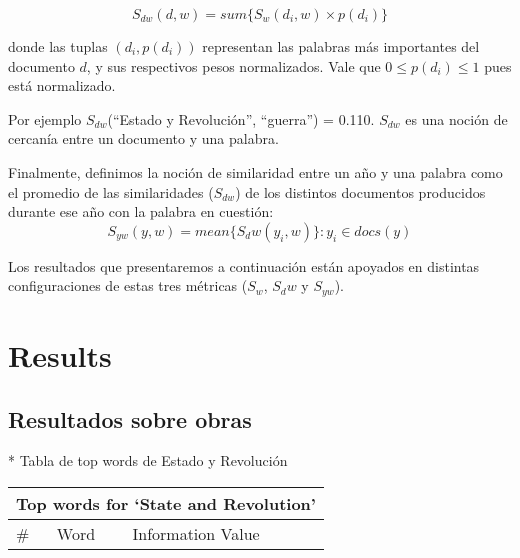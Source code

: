 \documentclass{pnastwo}
\begin{document}
\begin{article}
\begin{equation}
S_{dw}(d, w) = sum \{ S_w(d_i, w) \times p(d_i)  \} 
\end{equation}

donde las tuplas $(d_i , p(d_i))$ representan las palabras más importantes del documento $d$, y sus respectivos pesos normalizados. Vale que $0 \leq p(d_i) \leq 1$ pues está normalizado.

Por ejemplo $S_{dw}$(“Estado y Revolución”, “guerra”) = 0.110. $S_{dw}$ es una noción de cercanía entre un documento y una palabra.

Finalmente, definimos la noción de similaridad entre un año y una palabra como el promedio de las similaridades ($S_{dw}$) 
de los distintos documentos producidos durante ese año con la palabra en cuestión:
\begin{equation}
  S_{yw}(y, w) = mean \{ S_dw(y_i, w) \} : y_i \in docs(y) 
\end{equation}

Los resultados que presentaremos a continuaci\'on est\'an apoyados en distintas configuraciones de estas tres m\'etricas ($S_w$, $S_dw$ y $S_{yw}$).

% 

\section{Results}
\subsection{Resultados sobre obras}
* Tabla de top words de Estado y Revolución
\begin{center}
  \begin{tabular}{ | l | l | l |}
    \hline
    \multicolumn{3}{|c|}{Top words for `State and Revolution'} \\ \hline
    \# & Word & Information Value \\ \hline


\end{tabular}
\end{center}
\end{article}
\end{document}

